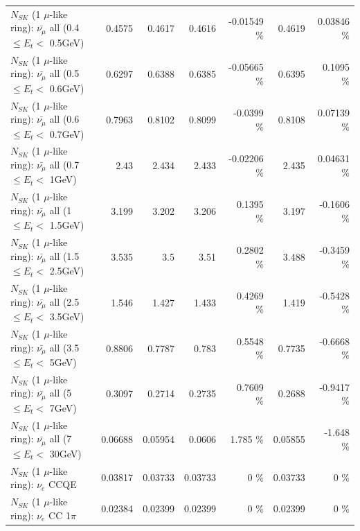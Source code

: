 \begin{table}
\begin{tabular}{| l | r | r | r  r | r  r |}
 $N_{SK}$ (1 $\mu$-like ring): $\bar{\nu_{\mu}}$ all (0.4 $\leq E_{t} <$ 0.5GeV) &          0.4575 &          0.4617 &          0.4616 & -0.01549 \%  &          0.4619 &  0.03846 \%  \\ 
 $N_{SK}$ (1 $\mu$-like ring): $\bar{\nu_{\mu}}$ all (0.5 $\leq E_{t} <$ 0.6GeV) &          0.6297 &          0.6388 &          0.6385 & -0.05665 \%  &          0.6395 &   0.1095 \%  \\ 
 $N_{SK}$ (1 $\mu$-like ring): $\bar{\nu_{\mu}}$ all (0.6 $\leq E_{t} <$ 0.7GeV) &          0.7963 &          0.8102 &          0.8099 &  -0.0399 \%  &          0.8108 &  0.07139 \%  \\ 
   $N_{SK}$ (1 $\mu$-like ring): $\bar{\nu_{\mu}}$ all (0.7 $\leq E_{t} <$ 1GeV) &            2.43 &           2.434 &           2.433 & -0.02206 \%  &           2.435 &  0.04631 \%  \\ 
   $N_{SK}$ (1 $\mu$-like ring): $\bar{\nu_{\mu}}$ all (1 $\leq E_{t} <$ 1.5GeV) &           3.199 &           3.202 &           3.206 &   0.1395 \%  &           3.197 &  -0.1606 \%  \\ 
 $N_{SK}$ (1 $\mu$-like ring): $\bar{\nu_{\mu}}$ all (1.5 $\leq E_{t} <$ 2.5GeV) &           3.535 &             3.5 &            3.51 &   0.2802 \%  &           3.488 &  -0.3459 \%  \\ 
 $N_{SK}$ (1 $\mu$-like ring): $\bar{\nu_{\mu}}$ all (2.5 $\leq E_{t} <$ 3.5GeV) &           1.546 &           1.427 &           1.433 &   0.4269 \%  &           1.419 &  -0.5428 \%  \\ 
   $N_{SK}$ (1 $\mu$-like ring): $\bar{\nu_{\mu}}$ all (3.5 $\leq E_{t} <$ 5GeV) &          0.8806 &          0.7787 &           0.783 &   0.5548 \%  &          0.7735 &  -0.6668 \%  \\ 
     $N_{SK}$ (1 $\mu$-like ring): $\bar{\nu_{\mu}}$ all (5 $\leq E_{t} <$ 7GeV) &          0.3097 &          0.2714 &          0.2735 &   0.7609 \%  &          0.2688 &  -0.9417 \%  \\ 
    $N_{SK}$ (1 $\mu$-like ring): $\bar{\nu_{\mu}}$ all (7 $\leq E_{t} <$ 30GeV) &         0.06688 &         0.05954 &          0.0606 &    1.785 \%  &         0.05855 &   -1.648 \%  \\ 
\hline
\hline
\hline
                                      $N_{SK}$ (1 $\mu$-like ring): $\nu_e$ CCQE &         0.03817 &         0.03733 &         0.03733 &        0 \%  &         0.03733 &        0 \%  \\ 
                                 $N_{SK}$ (1 $\mu$-like ring): $\nu_e$ CC 1$\pi$ &         0.02384 &         0.02399 &         0.02399 &        0 \%  &         0.02399 &        0 \%  \\ 

\end{tabular}
\end{table}
